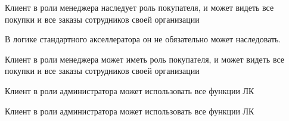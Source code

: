 {


\begin{wiki}
Клиент в роли менеджера наследует роль покупателя, и может видеть все покупки и все заказы сотрудников своей организации
\end{wiki}

\begin{teamidea}
В логике стандартного акселлератора он не обязательно может наследовать.
\end{teamidea}


\begin{itogo}
Клиент в роли менеджера может иметь роль покупателя, и может видеть все покупки и все заказы сотрудников своей организации
\end{itogo}


}



{

\begin{wiki}
Клиент в роли администратора может использовать все функции ЛК
\end{wiki}


\begin{itogo}
Клиент в роли администратора может использовать все функции ЛК
\end{itogo}


}


